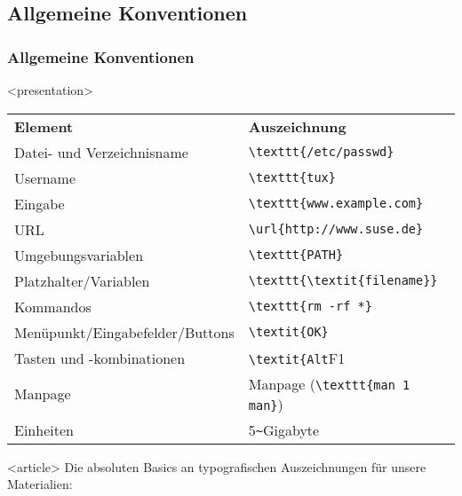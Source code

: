 \subsection{Allgemeine Konventionen}
\begin{frame}[fragile]
\frametitle<presentation>{Allgemeine Konventionen}


\mode
<presentation>
\small
\begin{block}{}
\begin{center}
\begin{tabularx}{\textwidth}{lX}
\textbf{Element} & \textbf{Auszeichnung}\\
Datei- und Verzeichnisname & \verb+\texttt{/etc/passwd}+\\
Username & \verb+\texttt{tux}+ \\
Eingabe & \verb+\texttt{www.example.com}+ \\
URL & \verb+\url{http://www.suse.de}+ \\
Umgebungsvariablen & \verb+\texttt{PATH}+ \\
Platzhalter/Variablen & \verb+\texttt{\textit{filename}}+ \\
Kommandos & \verb+\texttt{rm -rf *}+ \\
Menüpunkt/Eingabefelder/Buttons & \verb+\textit{OK}+ \\
Tasten und -kombinationen & \verb+\textit{Alt+F1}+ \\
Manpage & Manpage (\verb+\texttt{man 1 man}+)\\
Einheiten & 5\verb+~+Gigabyte\\
\end{tabularx}
\end{center}
\end{block}
\normalsize


\mode
<article>
Die absoluten Basics an typografischen Auszeichnungen für unsere Materialien:


\end{frame}
